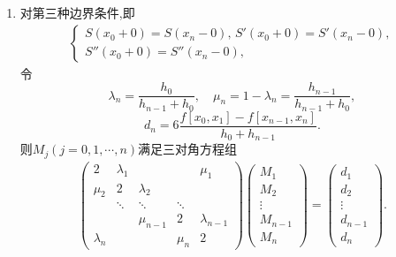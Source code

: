 \documentclass[../../main.tex]{subfiles}%
\begin{document}
\begin{theorem}
\begin{enumerate}[(1)]
\item 对第三种边界条件,即
\begin{align*}
\begin{cases}
S(x_0 + 0) = S(x_n - 0), \, S'(x_0 + 0) = S'(x_n - 0), \\
S''(x_0 + 0) = S''(x_n - 0),
\end{cases}
\end{align*}
令
\[
\lambda_n = \frac{h_0}{h_{n - 1} + h_0}, \quad \mu_n = 1 - \lambda_n = \frac{h_{n - 1}}{h_{n - 1} + h_0},
\]
\[
d_n = 6 \frac{f[x_0, x_1] - f[x_{n - 1}, x_n]}{h_0 + h_{n - 1}}.
\]
则$M_j(j=0,1,\cdots,n)$满足三对角方程组
\begin{align}
\begin{pmatrix}
2 & \lambda_1 & & & \mu_1 \\
\mu_2 & 2 & \lambda_2 & & \\
& \ddots & \ddots & \ddots & \\
& & \mu_{n - 1} & 2 & \lambda_{n - 1} \\
\lambda_n & & & \mu_n & 2
\end{pmatrix}
\begin{pmatrix}
M_1 \\
M_2 \\
\vdots \\
M_{n - 1} \\
M_n
\end{pmatrix}
=
\begin{pmatrix}
d_1 \\
d_2 \\
\vdots \\
d_{n - 1} \\
d_n
\end{pmatrix}. \label{eq:数值分析-6.16}
\end{align}
\end{enumerate}
\end{theorem}
\end{document}
